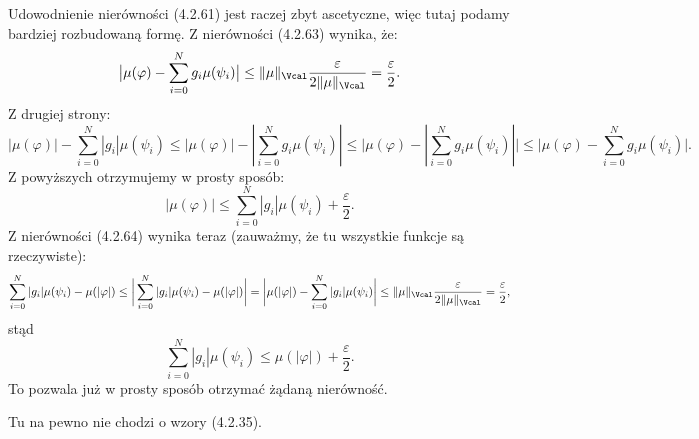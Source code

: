 \documentclass[a4paper,11pt]{article}
\numberwithin{equation}{section}
\begin{document}
\noindent
{} Udowodnienie nierówności (4.2.61) jest raczej zbyt
ascetyczne, więc tutaj podamy bardziej rozbudowaną formę. Z
nierówności (4.2.63) wynika, że:
\begin{equation}
  \label{eq:SchwartzKAMVolI-04}
  \big| \mu( \varphi ) - \sum_{ i = 0 }^{ N } g_{ i } \mu( \psi_{ i } ) \big|
  \leq
  \Vert \mu \Vert_{ \Vcal } \frac{ \varepsilon }{ 2 \Vert \mu \Vert_{ \Vcal } } = \frac{ \varepsilon }{ 2 }.
\end{equation}
Z drugiej strony:
\begin{equation}
  \label{eq:SchwartzKAMVolI-05}
  | \mu( \varphi ) | - \sum_{ i = 0 }^{ N } | g_{ i } | \mu( \psi_{ i } )
  \leq
  | \mu( \varphi ) | - | \sum_{ i = 0 }^{ N } g_{ i } \mu( \psi_{ i } ) |
  \leq
  \bigg| \mu( \varphi ) - | \sum_{ i = 0 }^{ N }
  g_{ i } \mu( \psi_{ i } ) | \bigg| \leq \bigg| \mu( \varphi )
  - \sum_{ i = 0 }^{ N } g_{ i } \mu( \psi_{ i } ) \bigg|.
\end{equation}
Z powyższych otrzymujemy w prosty sposób:
\begin{equation}
  \label{eq:SchwartzKAMVolI-06}
  | \mu( \varphi ) |
  \leq
  \sum_{ i = 0 }^{ N } | g_{ i } | \mu( \psi_{ i } ) + \frac{ \varepsilon }{ 2 }.
\end{equation}
Z nierówności (4.2.64) wynika teraz (zauważmy, że tu wszystkie funkcje
są rzeczywiste):
\begin{equation}
  \label{eq:SchwartzKAMVolI-07}
  \sum_{ i = 0 }^{ N } | g_{ i } | \mu( \psi_{ i } ) - \mu( | \varphi | )
  \leq
  \bigg| \sum_{ i = 0 }^{ N } | g_{ i } | \mu( \psi_{ i } ) - \mu( | \varphi | ) \bigg|
  =
  \bigg| \mu( | \varphi | ) - \sum_{ i = 0 }^{ N } | g_{ i } | \mu( \psi_{ i } ) \bigg|
  \leq
  \Vert \mu \Vert_{ \Vcal } \frac{ \varepsilon }{ 2 \Vert \mu \Vert_{ \Vcal } }
  = \frac{ \varepsilon }{ 2 },
\end{equation}
stąd
\begin{equation}
  \label{eq:SchwartzKAMVolI-08}
  \sum_{ i = 0 }^{ N } | g_{ i } | \mu( \psi_{ i } )
  \leq \mu( | \varphi | ) + \frac{ \varepsilon }{ 2 }.
\end{equation}
To pozwala już w prosty sposób otrzymać żądaną nierówność.

\VerSpaceFour





\noindent
{} Tu na pewno nie chodzi o wzory (4.2.35).

\VerSpaceFour
\end{document}
